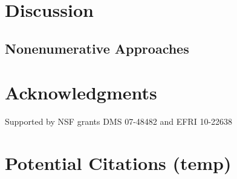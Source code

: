 \documentclass[12pt]{article}
\begin{document}
\section{Discussion}
\subsection{Nonenumerative Approaches}

\section*{Acknowledgments}\label{ackowledgements}
        Supported by NSF grants DMS 07-48482 and EFRI 10-22638

\section{Potential Citations (temp)}
~\cite{Coxeter1963}
~\cite{Grunbaum2003}
~\cite{Cromwell1997}
~\cite{Ziegler1995}
~\cite{Gidas1995}
~\cite{Eden1961}
~\cite{Grayson2012}






\end{document}
